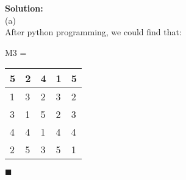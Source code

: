 \documentclass{article}
\newenvironment{solution}                               %
{\textbf{Solution:} \\}{$\blacksquare$\newline}         %
\begin{document}
    \begin{solution}
        (a) \\
        After python programming, we could find that:
        \begin{center}
            M3 = 
            \begin{tabular}{|l|l|l|l|l|}
                \hline 5 & 2 & 4 & 1 & 5 \\
                \hline 1 & 3 & 2 & 3 & 2 \\
                \hline 3 & 1 & 5 & 2 & 3 \\
                \hline 4 & 4 & 1 & 4 & 4 \\
                \hline 2 & 5 & 3 & 5 & 1 \\
                \hline
            \end{tabular}
        \end{center}
    \end{solution}
\end{document}
